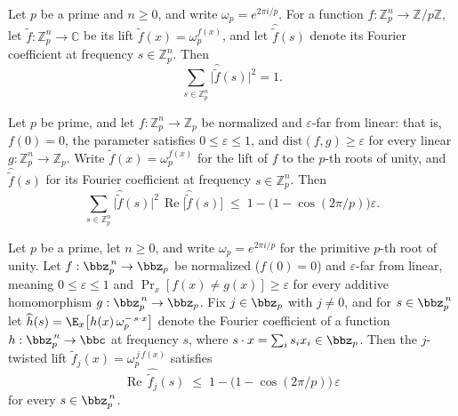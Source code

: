 \begin{lemma}
\label{ZkBLR.parseval_lift_omega}
\leanok
{}
Let $p$ be a prime and $n \ge 0$, and write $\omega_p = e^{2\pi i/p}$. For a function $f
: \mathbb{Z}_p^n \to \mathbb{Z}/p\mathbb{Z}$, let $\widetilde{f} : \mathbb{Z}_p^n \to
\mathbb{C}$ be its lift $\widetilde{f}(x) = \omega_p^{f(x)}$, and let
$\widehat{\widetilde{f}}(s)$ denote its Fourier coefficient at frequency $s \in
\mathbb{Z}_p^n$. Then
\[
  \sum_{s \in \mathbb{Z}_p^n} \bigl|\widehat{\widetilde{f}}(s)\bigr|^2 = 1.
\]
\end{lemma}

\begin{lemma}
\label{ZkBLR.weighted_fourier_sum_bound}
\leanok
{}
Let $p$ be prime, and let $f : \mathbb{Z}_p^n \to \mathbb{Z}_p$ be normalized and
$\varepsilon$-far from linear: that is, $f(0) = 0$, the parameter satisfies $0 \le
\varepsilon \le 1$, and $\mathrm{dist}(f,g) \ge \varepsilon$ for every linear $g :
\mathbb{Z}_p^n \to \mathbb{Z}_p$. Write $\widetilde{f}(x) = \omega_p^{f(x)}$ for the
lift of $f$ to the $p$-th roots of unity, and $\hat{\widetilde{f}}(s)$ for its Fourier
coefficient at frequency $s \in \mathbb{Z}_p^n$. Then
\[
  \sum_{s \in \mathbb{Z}_p^n}
    \bigl|\hat{\widetilde{f}}(s)\bigr|^2 \,
    \operatorname{Re}\bigl[\hat{\widetilde{f}}(s)\bigr]
  \;\le\;
  1 - \bigl(1 - \cos(2\pi/p)\bigr)\varepsilon .
\]
\end{lemma}

\begin{lemma}
\label{ZkBLR.re_fourier_coeff_lift_omega_j_bound}
\leanok
{}
Let $p$ be a prime, let $n \ge 0$, and write $\omega_p = e^{2\pi i/p}$ for the primitive
$p$-th root of unity. Let $f : \bbz_p^{\,n} \to \bbz_p$ be normalized ($f(0)=0$) and
$\varepsilon$-far from linear, meaning $0 \le \varepsilon \le 1$ and $\Pr_x[f(x)\ne
g(x)] \ge \varepsilon$ for every additive homomorphism $g : \bbz_p^{\,n} \to \bbz_p$.
Fix $j \in \bbz_p$ with $j \ne 0$, and for $s \in \bbz_p^{\,n}$ let $\widehat{h}(s) =
\E_x\bigl[h(x)\,\omega_p^{-\,s\cdot x}\bigr]$ denote the Fourier coefficient of a
function $h : \bbz_p^{\,n} \to \bbc$ at frequency $s$, where $s\cdot x = \sum_{i} s_i
x_i \in \bbz_p$. Then the $j$-twisted lift $\widetilde{f}_j(x) = \omega_p^{\,j\,f(x)}$
satisfies
\[
\operatorname{Re}\,\widehat{\widetilde{f}_j}(s) \;\le\; 1 - \bigl(1 -
\cos(2\pi/p)\bigr)\,\varepsilon
\]
for every $s \in \bbz_p^{\,n}$.
\end{lemma}

